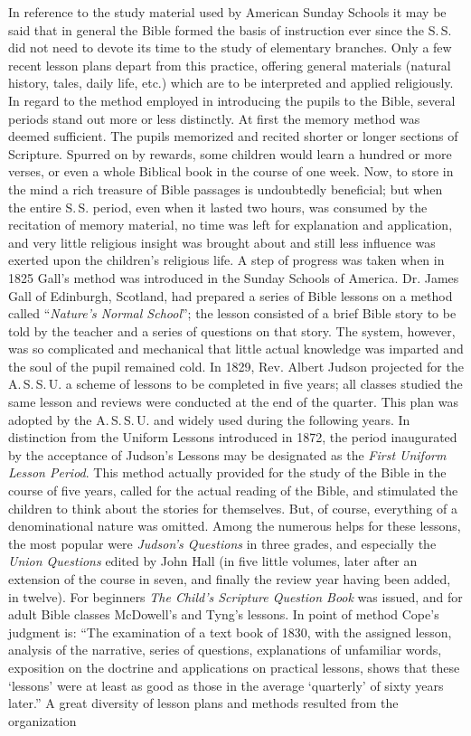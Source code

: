 In reference to the study material used by American Sunday Schools it may be said that in general the Bible formed the basis of instruction ever since the S.\,S. did not need to devote its time to the study of elementary branches. Only a few recent lesson plans depart from this practice, offering general materials (natural history, tales, daily life, etc.) which are to be interpreted and applied religiously. In regard to the method employed in introducing the pupils to the Bible, several periods stand out more or less distinctly. At first the memory method was deemed sufficient. The pupils memorized and recited shorter or longer sections of Scripture. Spurred on by rewards, some children would learn a hundred or more verses, or even a whole Biblical book in the course of one week. Now, to store in the mind a rich treasure of Bible passages is undoubtedly beneficial; but when the entire S.\,S. period, even when it lasted two hours, was consumed by the recitation of memory material, no time was left for explanation and application, and very little religious insight was brought about and still less influence was exerted upon the children’s religious life. A step of progress was taken
when in 1825 Gall’s method was introduced in the Sunday Schools of America. Dr. James Gall of Edinburgh, Scotland, had prepared a series of Bible lessons on a method called “\emph{Nature’s Normal School}”; the lesson consisted of a brief Bible story to be told by the teacher and a series of questions on that story. The system, however, was so complicated and mechanical that little actual knowledge was imparted and the soul of the pupil remained cold. In 1829, Rev. Albert Judson projected for the A.\,S.\,S.\,U. a scheme of lessons to be completed in five years; all classes studied the same lesson and reviews were conducted at the end of the quarter. This plan was adopted by the A.\,S.\,S.\,U. and widely used during the following years. In distinction from the Uniform Lessons introduced in 1872, the period inaugurated by the acceptance of Judson’s Lessons may be designated as the \emph{First Uniform Lesson Period}. This method actually provided for the study of the Bible in the course of five years, called for the actual reading of the Bible, and stimulated the children to think about the stories for themselves. But, of course, everything of a denominational nature was omitted. Among the numerous helps for these lessons, the most popular were \emph{Judson’s Questions} in three grades, and especially the \emph{Union Questions} edited by John Hall (in five little volumes, later after an extension of the course in seven, and finally the review year having been added, in twelve). For beginners \emph{The Child’s Scripture Question Book} was issued, and for adult Bible classes McDowell’s and Tyng’s lessons. In point of method Cope’s judgment is: “The examination of a text book of 1830, with the assigned lesson, analysis of the narrative, series of questions, explanations of unfamiliar words, exposition on the doctrine and applications on practical lessons, shows that these ‘lessons’ were at least as good as those in the average ‘quarterly’ of sixty years later.” A great diversity of lesson plans and methods resulted from the organization
